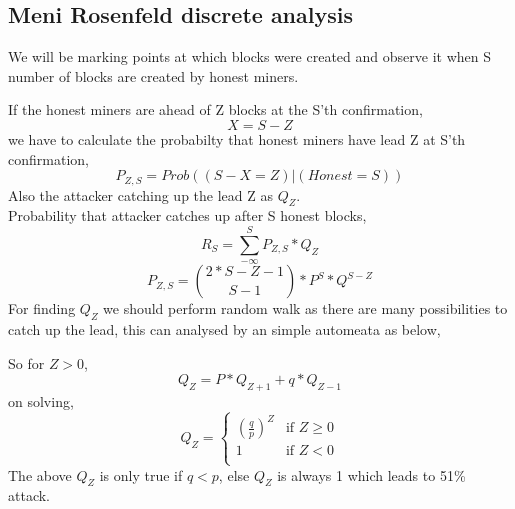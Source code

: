 \documentclass{article}
\begin{document}
\subsection{Meni Rosenfeld discrete analysis}
We will be marking points at which blocks were created and observe it when S number of blocks are created by honest miners.
\begin{center}
\end{center}
If the honest miners are ahead of Z blocks at the S'th confirmation,
$$X = S - Z$$
we have to calculate the probabilty that honest miners have lead Z  at S'th confirmation, 
$$P_{Z,S} = Prob((S -X = Z) | (Honest = S) )$$
Also the attacker catching up the lead Z as $Q_{Z}$. \\
Probability that attacker catches up after S honest blocks,
$$R_{S} = \sum_{-\infty}^{S}P_{Z,S}*Q_{Z}$$
$$P_{Z,S} = \binom{2*S - Z - 1}{S - 1}*P^{S}*Q^{S-Z}$$
For finding $Q_Z$ we should perform random walk as there are many possibilities to catch up the lead, this can analysed by an simple automeata as below, 
\begin{center}
\end{center}
So for $Z > 0$,
$$Q_Z = P*Q_{Z+1} + q*Q_{Z-1}$$
on solving, 
\[
Q_{Z} =
\begin{cases}
(\frac{q}{p})^{Z} & \text{if } Z \geq 0 \\
1 & \text{if } Z < 0 \\
\end{cases}
\]
The above $Q_{Z}$ is only true if $ q < p $, else $Q_{Z}$ is always 1 which leads to 51\% attack.
\end{document}
